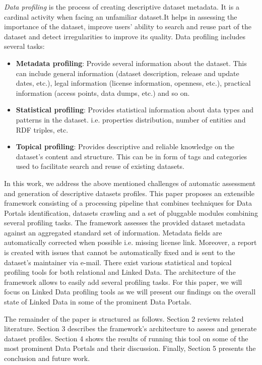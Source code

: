 \documentclass[runningheads,a4paper]{llncs}
\begin{document}
\textit{Data profiling} is the process of creating descriptive dataset metadata. It is a cardinal activity when facing an unfamiliar dataset\cite{semwebprofiling}.It helps in assessing the importance of the dataset, improve users' ability to search and reuse part of the dataset and detect irregularities to improve its quality. Data profiling includes several tasks:
\begin{itemize}
  \item \textbf{Metadata profiling}: Provide several information about the dataset. This can include general information (dataset description, release and update dates, etc.), legal information (license information, openness, etc.), practical information (access points, data dumps, etc.) and so on.
  \item \textbf{Statistical profiling}: Provides statistical information about data types and patterns in the dataset. i.e. properties distribution, number of entities and RDF triples, etc.
  \item \textbf{Topical profiling}: Provides descriptive and reliable knowledge on the dataset's content and structure. This can be in form of tags and categories used to facilitate search and reuse of existing datasets.
\end{itemize}

In this work, we address the above mentioned challenges of automatic assessment and generation of descriptive datasets profiles. This paper proposes an extensible framework consisting of a processing pipeline that combines techniques for Data Portals identification, datasets crawling and a set of pluggable modules combining several profiling tasks. The framework assesses the provided dataset metadata against an aggregated standard set of information. Metadata fields are automatically corrected when possible i.e. missing license link. Moreover, a report is created with issues that cannot be automatically fixed and is sent to the dataset's maintainer via e-mail. There exist various statistical and topical profiling tools for both relational and Linked Data. The architecture of the framework allows to easily add several profiling tasks. For this paper, we will focus on Linked Data profiling tools as we will present our findings on the overall state of Linked Data in some of the prominent Data Portals.

The remainder of the paper is structured as follows. Section 2 reviews related literature. Section 3 describes the framework's architecture to assess and generate dataset profiles. Section 4 shows the results of running this tool on some of the most prominent Data Portals and their discussion. Finally, Section 5 presents the conclusion and future work.
\end{document}
